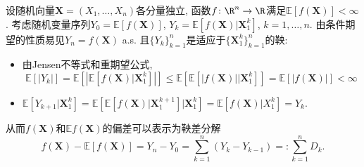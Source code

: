 设随机向量$\bm X = (X_1, \dots, X_n)$各分量独立, 函数$f \colon \R^n \to \R$满足$\mathbb{E}[f(\bm X)] < \infty$. 
考虑随机变量序列$Y_0 = \mathbb{E}[f(\bm X)]$, $Y_k = \mathbb{E}[f(\bm X)|\bm X_1^k]$, $k = 1, \dots, n$. 
由条件期望的性质易见$Y_n = f(\bm X)$ a.s. 且$\{Y_k\}_{k=1}^n$是适应于$\{\bm X_1^k\}_{k=1}^n$的鞅: 
\begin{itemize}
	\item 由Jensen不等式和重期望公式, 
		\begin{equation*}
			\mathbb{E}[|Y_k|]
			= \mathbb{E}\left[\left|\mathbb{E}[f(\bm X)|\bm X_1^k]\right|\right] 
			\leq \mathbb{E}\left[\mathbb{E}[|f(\bm X)||\bm X_1^k] \right]
			= \mathbb{E}[|f(\bm X)|]
			< \infty
		\end{equation*}
	\item $\mathbb{E}[Y_{k+1}|\bm X_1^k] = \mathbb{E}\left[\mathbb{E}[f(\bm X)|\bm X_1^{k+1}] \big|\bm X_1^k\right] = \mathbb{E}[f(\bm X) | X_1^k] = Y_k$. 
\end{itemize}
从而$f(\bm X)$和$\mathbb{E}f(\bm X)$的偏差可以表示为鞅差分解
\begin{equation*}
	f(\bm X) - \mathbb{E}[f(\bm X)] 
	= Y_n - Y_0 
	= \sum_{k=1}^n (Y_k - Y_{k-1})
	=: \sum_{k=1}^n D_k.
\end{equation*}

